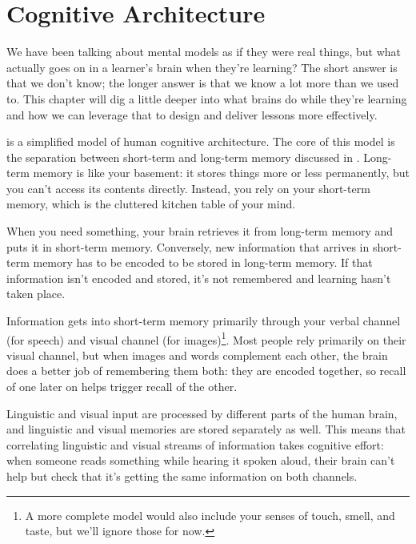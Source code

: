 \chapter{Cognitive Architecture}\label{s:architecture}

We have been talking about mental models as if they were real things,
but what actually goes on in a learner's brain when they're learning?
The short answer is that we don't know;
the longer answer is that we know a lot more than we used to.
This chapter will dig a little deeper into what brains do while they're learning
and how we can leverage that to design and deliver lessons more effectively.



 is a simplified model of human cognitive architecture.
The core of this model is
the separation between short-term and long-term memory discussed in .
Long-term memory is like your basement:
it stores things more or less permanently,
but you can't access its contents directly.
Instead,
you rely on your short-term memory,
which is the cluttered kitchen table of your mind.

When you need something,
your brain retrieves it from long-term memory and puts it in short-term memory.
Conversely,
new information that arrives in short-term memory
has to be encoded to be stored in long-term memory.
If that information isn't encoded and stored,
it's not remembered and learning hasn't taken place.

Information gets into short-term memory primarily through
your verbal channel (for speech)
and visual channel
(for images)\footnote{
  A more complete model
  would also include your senses of touch, smell, and taste,
  but we'll ignore those for now.}.
Most people rely primarily on their visual channel,
but when images and words complement each other,
the brain does a better job of remembering them both:
they are encoded together,
so recall of one later on helps trigger recall of the other.

Linguistic and visual input are processed by different parts of the human brain,
and linguistic and visual memories are stored separately as well.
This means that correlating linguistic and visual streams of information takes cognitive effort:
when someone reads something while hearing it spoken aloud,
their brain can't help but check that it's getting the same information on both channels.

